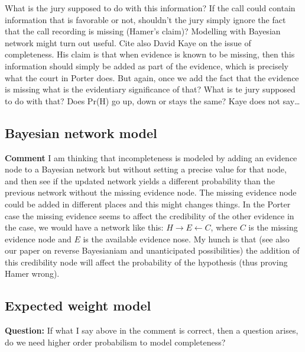 \documentclass[
  10pt,
  dvipsnames,enabledeprecatedfontcommands]{scrartcl}
\begin{document}
What is the jury supposed to do with this information? If the call could
contain information that is favorable or not, shouldn't the jury simply
ignore the fact that the call recording is missing (Hamer's claim)?
Modelling with Bayesian network might turn out useful. Cite also David
Kaye on the issue of completeness. His claim is that when evidence is
known to be missing, then this information should simply be added as
part of the evidence, which is precisely what the court in Porter does.
But again, once we add the fact that the evidence is missing what is the
evidentiary significance of that? What is te jury supposed to do with
that? Does Pr(H) go up, down or stays the same? Kaye does not
say\ldots{}

\hypertarget{bayesian-network-model}{%
\subsection{Bayesian network model}\label{bayesian-network-model}}

\textbf{Comment} I am thinking that incompleteness is modeled by adding
an evidence node to a Bayesian network but without setting a precise
value for that node, and then see if the updated network yields a
different probability than the previous network without the missing
evidence node. The missing evidence node could be added in different
places and this might changes things. In the Porter case the missing
evidence seems to affect the credibility of the other evidence in the
case, we would have a network like this:
\(H\rightarrow E \leftarrow C\), where \(C\) is the missing evidence
node and \(E\) is the available evidence nose. My hunch is that (see
also our paper on reverse Bayesianiam and unanticipated possibilities)
the addition of this credibility node will affect the probability of the
hypothesis (thus proving Hamer wrong).

\hypertarget{expected-weight-model}{%
\subsection{Expected weight model}\label{expected-weight-model}}

\textbf{Question:} If what I say above in the comment is correct, then a
question arises, do we need higher order probabilism to model
completeness?
\end{document}
